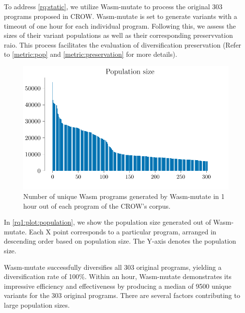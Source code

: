 \documentclass[sigplan,screen]{acmart}
\newcommand{\tool}{Wasm-mutate\xspace}
\newcommand{\wasm}{Wasm\xspace}
\begin{document}
\subsection{\rqstatic}
\label{rq:static:results}

\newcommand{\preserved}{72\%\xspace}

To address \ref{rq:static}, we utilize \tool to process the original 303 programs proposed in CROW\cite{arteaga2020crow}. 
\tool is set to generate variants with a timeout of one hour for each individual program. 
Following this, we assess the sizes of their variant populations as well as their corresponding preservvation raio. 
This process facilitates the evaluation of diversification preservation (Refer to \autoref{metric:pop} and \autoref{metric:preservation} for more details).

\begin{figure}
    \centering
    \includegraphics[width=\linewidth]{plots/rq1/population.pdf}
    \caption{Number of unique \wasm programs generated by \tool in 1 hour out of each program of the CROW's corpus.}
  \label{rq1:plot:population}
\end{figure}


In \autoref{rq1:plot:population}, we show the population size generated out of \tool. 
Each X point corresponds to a particular program, arranged in descending order based on population size. 
The Y-axis denotes the population size. 

\tool successfully diversifies all 303 original programs, yielding a diversification rate of 100\%. 
Within an hour, \tool demonstrates its impressive efficiency and effectiveness by producing a median of 9500 unique variants for the 303 original programs.
There are several factors contributing to large population sizes. 
\end{document}
